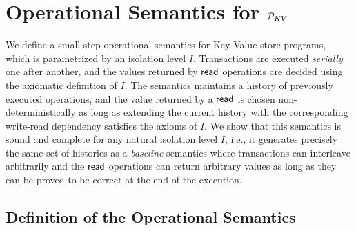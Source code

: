 
\section{Operational Semantics for $\mathcal{P}_{KV}$}
\label{sec:op-kv}

We define a small-step operational semantics for Key-Value store programs, which is parametrized by an isolation level $I$. Transactions are executed \emph{serially} one after another, and the values returned by $\textsf{read}$ operations are decided using the axiomatic definition of $I$. The semantics maintains a history of previously executed operations, and the value returned by a $\textsf{read}$ is chosen non-deterministically as long as extending the current history with the corresponding write-read dependency satisfies the axioms of $I$. 
We show that this semantics is sound and complete for any natural isolation level $I$, i.e., it generates precisely the same set of histories as a \emph{baseline} semantics where transactions can interleave arbitrarily and the $\textsf{read}$ operations can return arbitrary values as long as they can be proved to be correct at the end of the execution.

\subsection{Definition of the Operational Semantics}

